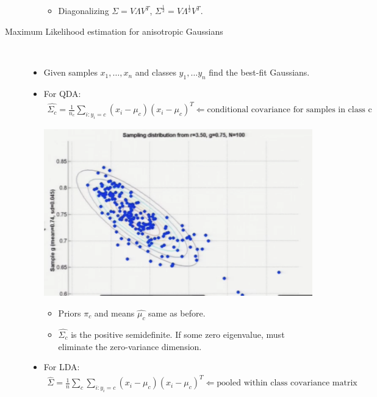 \documentclass[10pt]{article}
\begin{document}
\begin{description}
\begin{itemize}
\begin{itemize}
\begin{center}
						\end{center}
					\item Diagonalizing $\Sigma = V\Lambda V^{T}$, $\Sigma^{\frac{1}{2}} = V\Lambda^{\frac{1}{2}}V^{T}$.
				\end{itemize}
			\end{itemize}
		
		\item[Maximum Likelihood estimation for anisotropic Gaussians]
			\
			\begin{itemize}
				\item Given samples $x_{1}, \dots, x_{n}$ and classes $y_{1}, \dots y_{n}$ find the best-fit Gaussians.
				\item For QDA:
					\begin{align*}
						\hat{\Sigma_{c}} = \frac{1}{n_{c}} \sum_{i:y_{i}=c} (x_{i} - \mu_{c})(x_{i} - \mu_{c})^{T} \Leftarrow \text{conditional covariance for samples in class c}
					\end{align*}
					\begin{center}
						\includegraphics[scale=0.5]{images/smaple}
					\end{center}
					\begin{itemize}
					\item Priors $\pi_{c}$ and means $\hat{\mu_{c}}$ same as before.
					\item $\hat{\Sigma_{c}}$ is the positive semidefinite. If some zero eigenvalue, must eliminate the zero-variance dimension.
					\end{itemize}
				\item For LDA:
					\begin{align*}
						\hat{\Sigma} = \frac{1}{n} \sum_{c} \sum_{i:y_{i}=c} (x_{i} - \mu_{c})(x_{i} - \mu_{c})^{T} \Leftarrow \text{pooled within class covariance matrix}

\end{align*}
\end{itemize}
\end{description}
\end{document}
